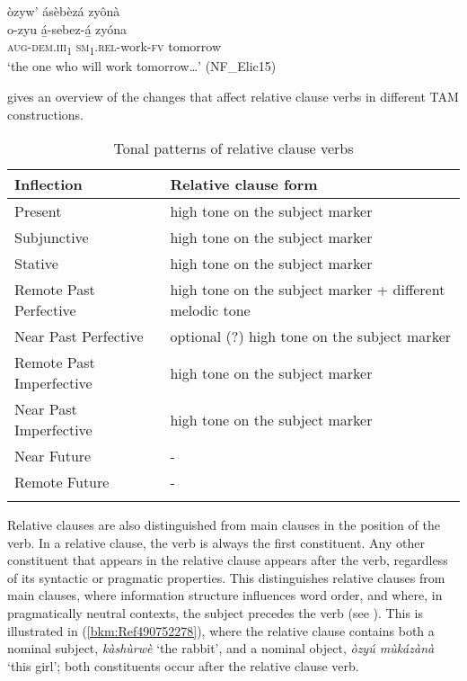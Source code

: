 \ea
\label{bkm:Ref492105917}
òzyw’ ásèbèzá zyônà\\
\gll o-zyu    á̲-sebez-á̲    zyóna\\
\textsc{aug}-\textsc{dem}.\textsc{iii}\textsubscript{1}  \textsc{sm}\textsubscript{1}.\textsc{rel}-work-\textsc{fv}  tomorrow\\
\glt ‘the one who will work tomorrow…’ (NF\_Elic15)
\z

 gives an overview of the changes that affect relative clause verbs in different TAM constructions.

\begin{table}
\label{bkm:Ref490576656}\caption{\label{tab:13:1}Tonal patterns of relative clause verbs}
\begin{tabularx}{\textwidth}{lQ}
\lsptoprule
Inflection & Relative clause form\\
\midrule
Present & high tone on the subject marker\\
Subjunctive & high tone on the subject marker\\
Stative & high tone on the subject marker\\
Remote Past Perfective & high tone on the subject marker + different melodic tone \\
Near Past Perfective & optional (?) high tone on the subject marker\\
Remote Past Imperfective & high tone on the subject marker\\
Near Past Imperfective & high tone on the subject marker\\
Near Future & -\\
Remote Future & -\\
\lspbottomrule
\end{tabularx}
\end{table}

Relative clauses are also distinguished from main clauses in the position of the verb. In a relative clause, the verb is always the first constituent. Any other constituent that appears in the relative clause appears after the verb, regardless of its syntactic or pragmatic properties. This distinguishes relative clauses from main clauses, where information structure influences word order, and where, in pragmatically neutral contexts, the subject precedes the verb (see ). This is illustrated in (\ref{bkm:Ref490752278}), where the relative clause contains both a nominal subject, \textit{kàshùrwè} ‘the rabbit’, and a nominal object, \textit{òzyú mùkázànà} ‘this girl’; both constituents occur after the relative clause verb.

